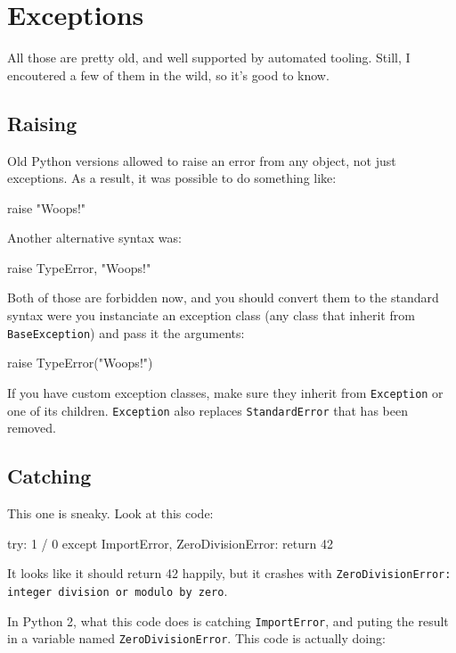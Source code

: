 \section{Exceptions}

All those are pretty old, and well supported by automated tooling. Still, I encoutered a few of them in the wild, so it's good to know.

\subsection{Raising}

Old Python versions allowed to raise an error from any object, not just exceptions. As a result, it was possible to do something like:

\begin{py2}
raise "Woops!"
\end{py2}

Another alternative syntax was:

\begin{py2}
raise TypeError, "Woops!"
\end{py2}

Both of those are forbidden now, and you should convert them to the standard syntax were you instanciate an exception class (any class that inherit from \lstinline{BaseException}) and pass it the arguments:

\begin{py2and3}
raise TypeError("Woops!")
\end{py2and3}

If you have custom exception classes, make sure they inherit from \lstinline{Exception} or one of its children. \lstinline{Exception} also replaces \lstinline{StandardError} that has been removed.

\subsection{Catching}

This one is sneaky. Look at this code:

\begin{py2}
try:
    1 / 0
except ImportError, ZeroDivisionError:
    return 42
\end{py2}

It looks like it should return 42 happily, but it crashes with \lstinline{ZeroDivisionError: integer division or modulo by zero}.

In Python 2, what this code does is catching \lstinline{ImportError}, and puting the result in a variable named \lstinline{ZeroDivisionError}. This code is actually doing:

